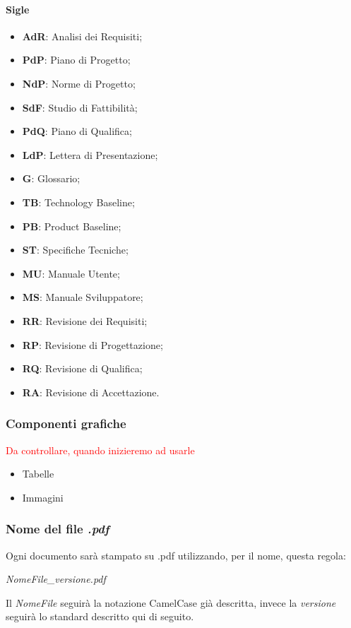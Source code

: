 	\paragraph{Sigle}
	\begin{itemize}
		\item \textbf{AdR}: Analisi dei Requisiti;
		\item \textbf{PdP}: Piano di Progetto;
		\item \textbf{NdP}: Norme di Progetto;
		\item \textbf{SdF}: Studio di Fattibilità;
		\item \textbf{PdQ}: Piano di Qualifica;
		\item \textbf{LdP}: Lettera di Presentazione;
		\item \textbf{G}: Glossario;
		\item \textbf{TB}: Technology Baseline;
		\item \textbf{PB}: Product Baseline;
		\item \textbf{ST}: Specifiche Tecniche;
		\item \textbf{MU}: Manuale Utente;
		\item \textbf{MS}: Manuale Sviluppatore;
		\item \textbf{RR}: Revisione dei Requisiti;
		\item \textbf{RP}: Revisione di Progettazione;
		\item \textbf{RQ}: Revisione di Qualifica;
		\item \textbf{RA}: Revisione di Accettazione.
	\end{itemize}
	
	\subsubsection{Componenti grafiche}
	\textcolor{red}{Da controllare, quando inizieremo ad usarle}
	\begin{itemize}
		\item Tabelle
		\item Immagini
	\end{itemize}
	\subsubsection{Nome del file \emph{.pdf}}
	Ogni documento sarà stampato su .pdf utilizzando, per il nome, questa regola:
	\begin{center}
		\emph{NomeFile\_versione.pdf}
	\end{center}
	Il \emph{NomeFile} seguirà la notazione CamelCase già descritta, invece la \emph{versione} seguirà lo standard descritto qui di seguito.
	
